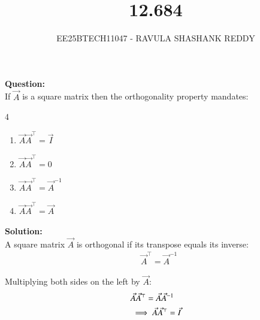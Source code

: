 \documentclass[journal]{article}
\begin{document}
	
	
	\vspace{3cm}
	
\title{12.684}
\author{EE25BTECH11047 - RAVULA SHASHANK REDDY}
\maketitle
\hrulefill
\bigskip 

\renewcommand{\thetable}{\theenumi}
\setlength{\intextsep}{10pt}

\textbf{Question:} \\

If $\vec{A}$ is a square matrix then the orthogonality property mandates:

\begin{multicols}{4}
\begin{enumerate}[label=\alph*)]
\item $\vec{A}\vec{A}^\top = \vec{I}$
\item $\vec{A}\vec{A}^\top = 0$
\item $\vec{A}\vec{A}^\top = \vec{A}^{-1}$
\item $\vec{A}\vec{A}^\top = \vec{A}$
\end{enumerate}
\end{multicols}

\textbf{Solution:}\\

A square matrix $\vec{A}$ is orthogonal if its transpose equals its inverse: 
\begin{align}
& \vec{A}^\top = \vec{A}^{-1} 
\end{align}

Multiplying both sides on the left by $\vec{A}$:
\begin{align}
& \vec{A} \vec{A}^\top = \vec{A} \vec{A}^{-1} \notag \\
& \implies \vec{A}\vec{A}^\top = \vec{I}
\end{align}
\end{document}
